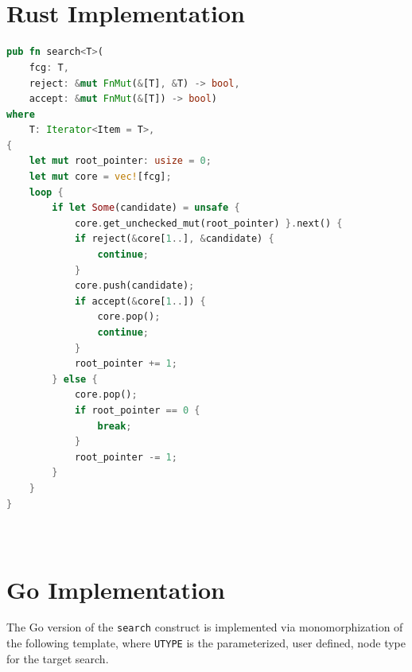 \documentclass[runningheads]{llncs}
\newcommand{\code}[1]{\texttt{#1}}
\begin{document}
\newpage
\begin{appendix}
\section{\\Rust Implementation}
\begin{lstlisting}[language=Rust, style=boxed]
pub fn search<T>(
	fcg: T,
	reject: &mut FnMut(&[T], &T) -> bool,
	accept: &mut FnMut(&[T]) -> bool)
where
    T: Iterator<Item = T>,
{
    let mut root_pointer: usize = 0;
    let mut core = vec![fcg];
    loop {
        if let Some(candidate) = unsafe {
        	core.get_unchecked_mut(root_pointer) }.next() {
            if reject(&core[1..], &candidate) {
                continue;
            }
            core.push(candidate);
            if accept(&core[1..]) {
                core.pop();
                continue;
            }
            root_pointer += 1;
        } else {
            core.pop();
            if root_pointer == 0 {
                break;
            }
            root_pointer -= 1;
        }
    }
}
\end{lstlisting}

\section{\\Go Implementation}
The Go version of the \code{search} construct is implemented via monomorphization of the following template, where \code{UTYPE} is the parameterized, user defined, node type for the target search.


\end{appendix}
\end{document}
